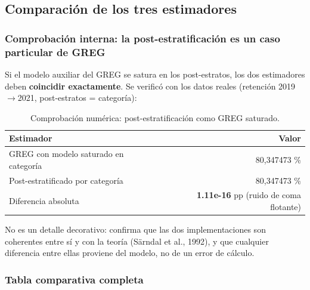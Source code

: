 \subsection{Comparación de los tres estimadores}
\label{sec:mues-comparacion}

\subsubsection{Comprobación interna: la post-estratificación es un caso particular de GREG}

Si el modelo auxiliar del GREG se satura en los post-estratos, los dos
estimadores deben \textbf{coincidir exactamente}. Se verificó con los datos
reales (retención 2019$\rightarrow$2021, post-estratos = categoría):

\begin{table}[H]
  \centering
  \small
  \caption{Comprobación numérica: post-estratificación como GREG saturado.}
  \label{tab:mues-greg-saturado}
  \begin{tabular}{@{}lr@{}}
    \toprule
    \textbf{Estimador} & \textbf{Valor} \\
    \midrule
    GREG con modelo saturado en categoría & 80,347473 \% \\
    Post-estratificado por categoría & 80,347473 \% \\
    Diferencia absoluta & \textbf{1.11e-16} pp (ruido de coma flotante) \\
    \bottomrule
  \end{tabular}
\end{table}

No es un detalle decorativo: confirma que las dos implementaciones son coherentes
entre sí y con la teoría (Särndal et al., 1992), y que cualquier diferencia entre
ellas proviene del modelo, no de un error de cálculo.

\subsubsection{Tabla comparativa completa}

